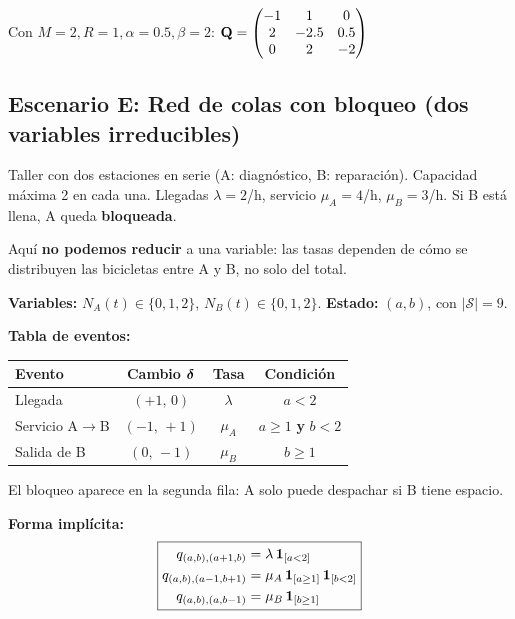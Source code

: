 \documentclass[11pt, letterpaper]{article}
\begin{document}
Con $M=2, R=1, \alpha=0.5, \beta=2$: \quad
$\mathbf{Q}=\begin{pmatrix}-1&1&0\\2&-2.5&0.5\\0&2&-2\end{pmatrix}$

\subsection{Escenario E: Red de colas con bloqueo (dos variables irreducibles)}

\begin{ejemplobox}[Enunciado]
Taller con dos estaciones en serie (A: diagn\'ostico, B: reparaci\'on). Capacidad m\'axima 2 en cada una. Llegadas $\lambda=2$/h, servicio $\mu_A=4$/h, $\mu_B=3$/h. Si B est\'a llena, A queda \textbf{bloqueada}.
\end{ejemplobox}

Aqu\'i \textbf{no podemos reducir} a una variable: las tasas dependen de c\'omo se distribuyen las bicicletas entre A y B, no solo del total.

\textbf{Variables:} $N_A(t)\in\{0,1,2\}$, $N_B(t)\in\{0,1,2\}$. \textbf{Estado:} $(a,b)$, con $|\mathcal{S}|=9$.

\textbf{Tabla de eventos:}

\begin{center}\small
\renewcommand{\arraystretch}{1.2}
\begin{tabular}{lccc}\toprule
\textbf{Evento} & \textbf{Cambio $\boldsymbol{\delta}$} & \textbf{Tasa} & \textbf{Condici\'on} \\\midrule
Llegada & $(+1,\,0)$ & $\lambda$ & $a<2$ \\
Servicio A$\to$B & $(-1,\,+1)$ & $\mu_A$ & $a\ge1$ \textbf{y} $b<2$ \\
Salida de B & $(0,\,-1)$ & $\mu_B$ & $b\ge1$ \\\bottomrule
\end{tabular}
\end{center}

El bloqueo aparece en la segunda fila: A solo puede despachar si B tiene espacio.

\textbf{Forma impl\'icita:}
\[
\boxed{\begin{aligned}
q_{(a,b),(a+1,b)} &= \lambda\,\mathbf{1}_{[a<2]} \\
q_{(a,b),(a-1,b+1)} &= \mu_A\,\mathbf{1}_{[a\ge1]}\,\mathbf{1}_{[b<2]} \\
q_{(a,b),(a,b-1)} &= \mu_B\,\mathbf{1}_{[b\ge1]}
\end{aligned}}
\]
\end{document}
